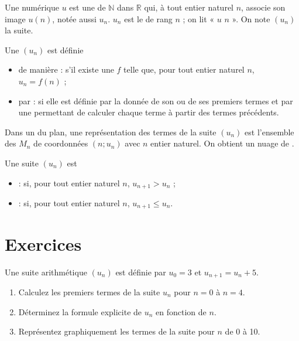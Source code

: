 \documentclass[12pt,a4paper,french]{book}
\begin{document}
\begin{defn}
Une  numérique $u$ est une  de $\mathbb{N}$ dans $\mathbb{R}$ qui, à tout entier naturel $n$, associe son image $u(n)$, notée aussi $u_n$. $u_n$ est le  de rang $n$ ; on lit « $u$  $n$ ». On note $(u_n)$ la suite.
\end{defn}

\begin{defn}
Une  $(u_n)$ est définie
\begin{itemize}
    \item de manière  : s'il existe une  $f$ telle que, pour tout entier naturel $n$, $u_n = f(n)$ ;
    \item par  : si elle est définie par la donnée de son ou de ses premiers termes et par une  permettant de calculer chaque terme à partir des termes précédents.
\end{itemize}
\end{defn}

\begin{defn}
Dans un  du plan, une représentation des termes de la suite $(u_n)$ est l'ensemble des  $M_n$ de coordonnées $(n ; u_n)$ avec $n$ entier naturel. On obtient un nuage de .
\end{defn}

\begin{defn}
Une suite $(u_n)$ est
\begin{itemize}
    \item {} : si, pour tout entier naturel $n$, $u_{n+1} > u_n$ ;
    \item {} : si, pour tout entier naturel $n$, $u_{n+1} \leq u_n$.
\end{itemize}
\end{defn}

\newpage

\section{Exercices}

\begin{exocor}
Une suite arithmétique $(u_n)$ est définie par $u_0 = 3$ et $u_{n+1} = u_n + 5$.

\begin{enumerate}
    \item Calculez les premiers termes de la suite $u_n$ pour $n = 0$ à $n = 4$.
    \item Déterminez la formule explicite de $u_n$ en fonction de $n$.
    \item Représentez graphiquement les termes de la suite pour $n$ de 0 à 10.
\end{enumerate}
\end{exocor}
\end{document}
